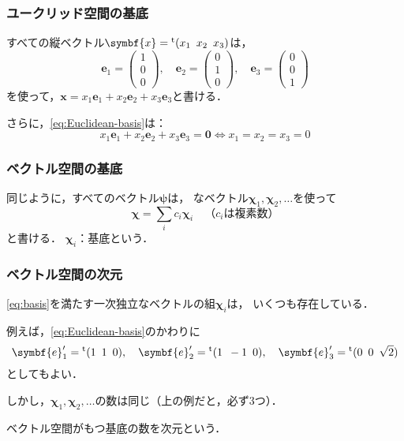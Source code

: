 \documentclass[
    10pt,
    ]{sotsu-beamer}
\begin{document}
\begin{frame}
    \frametitle{ユークリッド空間の基底}

    すべての縦ベクトル$\symbf{x} = \cvector{x_1 ; x_2 ; x_3}$は，
    \begin{equation}
        \label{eq:Euclidean-basis}
        \symbf{e}_1 = \begin{pmatrix} 1 \\ 0 \\ 0 \end{pmatrix}, \quad 
        \symbf{e}_2 = \begin{pmatrix} 0 \\ 1 \\ 0 \end{pmatrix}, \quad 
        \symbf{e}_3 = \begin{pmatrix} 0 \\ 0 \\ 1 \end{pmatrix}
    \end{equation}
    を使って，$\symbf{x} = x_1 \symbf{e}_1 + x_2 \symbf{e}_2 + x_3 \symbf{e}_3$と書ける．

    さらに，\eqref{eq:Euclidean-basis}は：
    \begin{equation*}
        x_1 \symbf{e}_1 + x_2 \symbf{e}_2 + x_3 \symbf{e}_3 = \symbf{0}
        \iff
        x_1 = x_2 = x_3 = 0
    \end{equation*}

\end{frame}


\begin{frame}
    \frametitle{ベクトル空間の基底}

    同じように，\alert{すべてのベクトル}$\symbf{\psi}$は，
    なベクトル$\symbf{\chi}_1, \symbf{\chi}_2, \dotsc$を使って
    \begin{equation}
        \label{eq:basis}
        \symbf{\chi} = \sum_i c_i \symbf{\chi}_i
        \quad \text{（$c_i$は複素数）}
    \end{equation}
    と書ける．
    \pause
    $\symbf{\chi}_i$：\alert{基底}という．

    

\end{frame}


\begin{frame}
    \frametitle{ベクトル空間の次元}

    \eqref{eq:basis}を満たす一次独立なベクトルの組$\symbf{\chi}_i$は，
    いくつも存在している．

    例えば，\eqref{eq:Euclidean-basis}のかわりに
    \begin{equation*}
        \symbf{e}'_1 = \cvector{1 ; 1 ; 0}, \quad 
        \symbf{e}'_2 = \cvector{1 ; {-1} ; 0}, \quad
        \symbf{e}'_3 = \cvector{0 ; 0 ; \sqrt{2}}
    \end{equation*}
    としてもよい．

    しかし，$\symbf{\chi}_1, \symbf{\chi}_2, \dotsc$の数は同じ（上の例だと，必ず3つ）．

    ベクトル空間がもつ基底の数を\alert{次元}という．


\end{frame}
\end{document}
